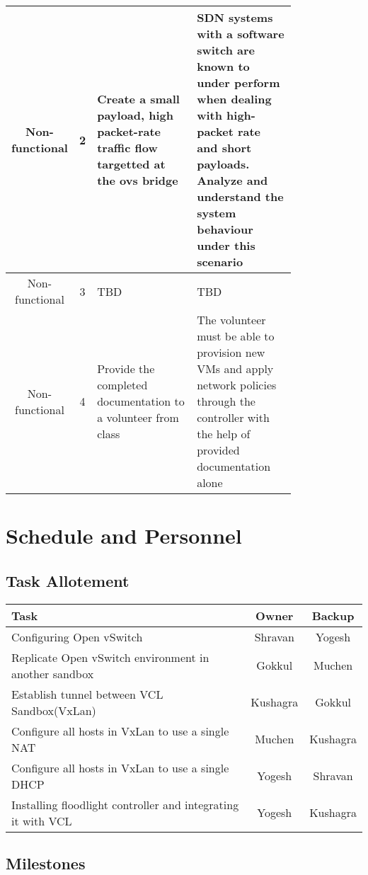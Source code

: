 \documentclass{article}
\begin{document}
\begin{tabular}{||c | c  | p{0.4\linewidth} | p{0.4\linewidth} ||}
     \hline
     Non-functional & 2 & Create a small payload, high packet-rate traffic flow targetted at the ovs bridge & SDN systems with a software switch are known to under perform when dealing with high-packet rate and short payloads. Analyze and understand the system behaviour under this scenario \\
     \hline
     Non-functional & 3 & TBD & TBD \\
     \hline
     Non-functional & 4 & Provide the completed documentation to a volunteer from class & The volunteer must be able to provision new VMs and apply network policies through the controller with the help of provided documentation alone \\     
    \hline
\end{tabular}
\section{Schedule and Personnel}

\subsection{Task Allotement}
\begin{center}


 \begin{tabular}{||l | c | c ||} 
 \hline
 Task & Owner & Backup \\ [2ex] 
 \hline\hline
  Configuring Open vSwitch & Shravan & Yogesh  \\
  \hline
  Replicate Open vSwitch environment in another sandbox & Gokkul & Muchen  \\ 
  \hline
  Establish tunnel between VCL Sandbox(VxLan) & Kushagra & Gokkul  \\ 
  \hline
  Configure all hosts in VxLan to use a single NAT & Muchen & Kushagra  \\ 
  \hline
  Configure all hosts in VxLan to use a single DHCP & Yogesh & Shravan  \\ 
  \hline
    Installing floodlight controller and integrating it with VCL & Yogesh & Kushagra  \\ 
 \hline
 \end{tabular}
\end{center}

\subsection{Milestones}
\end{document}
